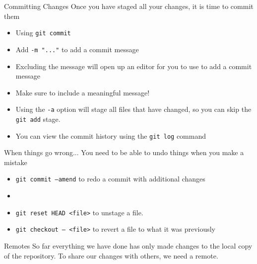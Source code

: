 \documentclass{beamer}
\begin{document}
\begin{frame}{Committing Changes}
    Once you have staged all your changes, it is time to commit them
    \begin{itemize}
        \item Using \texttt{git commit}
        \item Add \texttt{-m "..."} to add a commit message
        \item Excluding the message will open up an editor for you to use to add a commit message
        \item Make sure to include a meaningful message!
        \item Using the \texttt{-a} option will stage all files that have changed, so you can skip the \texttt{git add} stage.
        \item You can view the commit history using the \texttt{git log} command
    \end{itemize}
\end{frame}

\begin{frame}{When things go wrong...}
    You need to be able to undo things when you make a mistake
    \begin{itemize}
        \item \texttt{git commit --amend} to redo a commit with additional changes
        \item %
        \item \texttt{git reset HEAD <file>} to unstage a file.
        \item \texttt{git checkout -- <file>} to revert a file to what it was previously
    \end{itemize}
\end{frame}

\begin{frame}{Remotes}
    So far everything we have done has only made changes to the local copy of the repository. To share our changes with others, we need a remote.
\end{frame}
\end{document}
